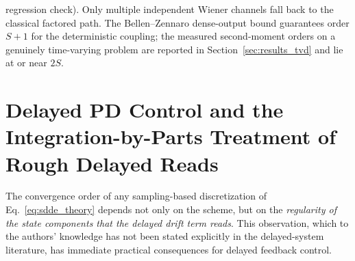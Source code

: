 \documentclass[preprint,12pt]{elsarticle}
\begin{document}
regression check). Only multiple independent Wiener channels fall back to the classical factored path. The Bellen--Zennaro dense-output bound \cite{BellenZennaro2003} guarantees order $S{+}1$ for the deterministic coupling; the measured second-moment orders on a genuinely time-varying problem are reported in Section~\ref{sec:results_tvd} and lie at or near $2S$.

\section{Delayed PD Control and the Integration-by-Parts Treatment of Rough Delayed Reads}
\label{sec:ibp}

The convergence order of any sampling-based discretization of Eq.~\eqref{eq:sdde_theory} depends not only on the scheme, but on the \emph{regularity of the state components that the delayed drift term reads}. This observation, which to the authors' knowledge has not been stated explicitly in the delayed-system literature, has immediate practical consequences for delayed feedback control.
\end{document}
